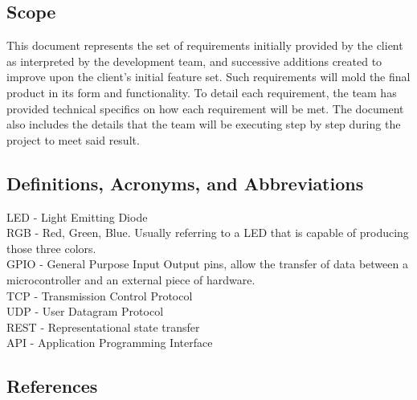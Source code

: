 \documentclass[onecolumn, draftclsnofoot,10pt, compsoc]{IEEEtran}
\begin{document}
		\subsection{Scope}
			This document represents the set of requirements initially provided by the client as interpreted by the development team, and successive additions created to improve upon the client's initial feature set.
			Such requirements will mold the final product in its form and functionality. To detail each requirement, the team has provided technical specifics on how each requirement will be met.  The document also
			includes the details that the team will be executing step by step	during the project to meet said result.

		\subsection{Definitions, Acronyms, and Abbreviations}
			LED - Light Emitting Diode \\
			RGB - Red, Green, Blue. Usually referring to a LED that is capable of producing those three colors. \\
			GPIO - General Purpose Input Output pins, allow the transfer of data between a microcontroller and an external piece of hardware. \\
			TCP - Transmission Control Protocol \\
			UDP - User Datagram Protocol \\
			REST - Representational state transfer \\
			API - Application Programming Interface \\

		\subsection{References}

		\begingroup
			\renewcommand{\addcontentsline}[3]{}%
			\renewcommand{\section}[2]{}%

			
			
\end{document}

